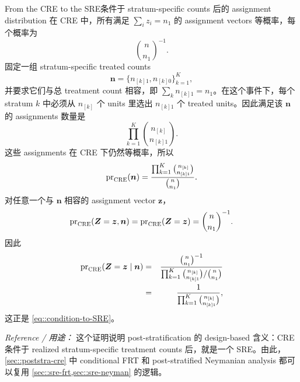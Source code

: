 \begin{exercisesolution}{From the CRE to the SRE}{条件于 stratum-specific counts 后的 assignment distribution}
在 CRE 中，所有满足 $\sum_i z_i=n_1$ 的 assignment vectors 等概率，每个概率为
\[
\binom{n}{n_1}^{-1}.
\]
固定一组 stratum-specific treated counts
\[
\boldsymbol n=\{n_{[k]1},n_{[k]0}\}_{k=1}^K,
\]
并要求它们与总 treatment count 相容，即 $\sum_k n_{[k]1}=n_1$。在这个事件下，每个 stratum $k$ 中必须从 $n_{[k]}$ 个 units 里选出 $n_{[k]1}$ 个 treated units。因此满足该 $\boldsymbol n$ 的 assignments 数量是
\[
\prod_{k=1}^K\binom{n_{[k]}}{n_{[k]1}}.
\]
这些 assignments 在 CRE 下仍然等概率，所以
\[
\textup{pr}_{\textsc{CRE}}(\boldsymbol n)
=
\frac{\prod_{k=1}^K\binom{n_{[k]}}{n_{[k]1}}}{\binom{n}{n_1}}.
\]
对任意一个与 $\boldsymbol n$ 相容的 assignment vector $\boldsymbol z$，
\[
\textup{pr}_{\textsc{CRE}}(\boldsymbol Z=\boldsymbol z,\boldsymbol n)
=\textup{pr}_{\textsc{CRE}}(\boldsymbol Z=\boldsymbol z)
=\binom{n}{n_1}^{-1}.
\]
因此
\begin{eqnarray*}
\textup{pr}_{\textsc{CRE}}(\boldsymbol Z=\boldsymbol z\mid\boldsymbol n)
&=&
\frac{\binom{n}{n_1}^{-1}}
{\prod_{k=1}^K\binom{n_{[k]}}{n_{[k]1}}/\binom{n}{n_1}}\\
&=&
\frac{1}{\prod_{k=1}^K\binom{n_{[k]}}{n_{[k]1}}},
\end{eqnarray*}
这正是 \cref{eq::condition-to-SRE}。

\emph{Reference / 用途：} 这个证明说明 post-stratification 的 design-based 含义：CRE 条件于 realized stratum-specific treatment counts 后，就是一个 SRE。由此，\cref{sec::poststra-cre} 中 conditional FRT 和 post-stratified Neymanian analysis 都可以复用 \cref{sec::sre-frt,sec::sre-neyman} 的逻辑。
\end{exercisesolution}

